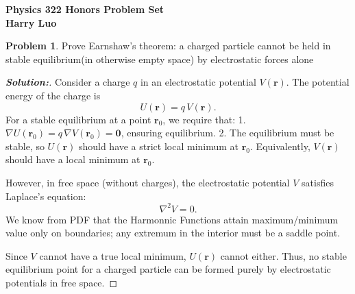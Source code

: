 \documentclass[12pt]{article}
\theoremstyle{definition}\newtheorem{problem}{Problem}
\newenvironment{solution}{\begin{proof}[\bfseries\textup{Solution:}]}{\end{proof}}
\begin{document}

\begin{center}
\bfseries Physics 322 Honors Problem Set  %
\\
Harry Luo %
\ 
\end{center}

\begin{problem}
    Prove Earnshaw’s theorem: a charged particle cannot be held in stable equilibrium(in otherwise empty space) by electrostatic forces alone
\end{problem}
\begin{solution}
    
    Consider a charge $q$ in an electrostatic potential $V(\mathbf{r})$. The potential energy of the charge is 
    \[
    U(\mathbf{r}) = q\, V(\mathbf{r}).
    \] 
    For a stable equilibrium at a point $\mathbf{r}_0$, we require that:
    1. $\nabla U(\mathbf{r}_0) = q\, \nabla V(\mathbf{r}_0) = \mathbf{0}$, ensuring equilibrium.
    2. The equilibrium must be stable, so $U(\mathbf{r})$ should have a strict local minimum at $\mathbf{r}_0$. Equivalently, $V(\mathbf{r})$ should have a local minimum at $\mathbf{r}_0$.
    
    However, in free space (without charges), the electrostatic potential $V$ satisfies Laplace’s equation:
    \[
    \nabla^2 V = 0.
    \]
   We know from PDF that the Harmonnic Functions attain maximum/minimum value only on boundaries; any extremum in the interior must be a saddle point.
    
    Since $V$ cannot have a true local minimum, $U(\mathbf{r})$ cannot either. Thus, no stable equilibrium point for a charged particle can be formed purely by electrostatic potentials in free space.
\end{solution}
\end{document}
